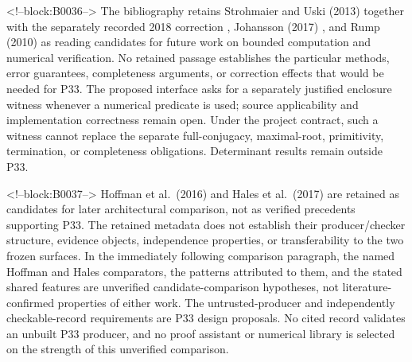 \documentclass[11pt,a4paper]{article}
\begin{document}
<!--block:B0036-->
The bibliography retains Strohmaier and Uski (2013) together with the separately recorded 2018 correction
\citep{P33-S16,P33-S16-CORR}
, Johansson (2017)
\citep{P33-S17}
, and Rump (2010)
\citep{P33-S18}
 as reading candidates for future work on bounded computation and numerical verification. No retained passage establishes the particular methods, error guarantees, completeness arguments, or correction effects that would be needed for P33. The proposed interface asks for a separately justified enclosure witness whenever a numerical predicate is used; source applicability and implementation correctness remain open. Under the project contract, such a witness cannot replace the separate full-conjugacy, maximal-root, primitivity, termination, or completeness obligations. Determinant results remain outside P33.

<!--block:B0037-->
Hoffman et al.~(2016)
\citep{P33-S19}
 and Hales et al.~(2017)
\citep{P33-S20}
 are retained as candidates for later architectural comparison, not as verified precedents supporting P33. The retained metadata does not establish their producer/checker structure, evidence objects, independence properties, or transferability to the two frozen surfaces. In the immediately following comparison paragraph, the named Hoffman and Hales comparators, the patterns attributed to them, and the stated shared features are unverified candidate-comparison hypotheses, not literature-confirmed properties of either work. The untrusted-producer and independently checkable-record requirements are P33 design proposals. No cited record validates an unbuilt P33 producer, and no proof assistant or numerical library is selected on the strength of this unverified comparison.
\end{document}
